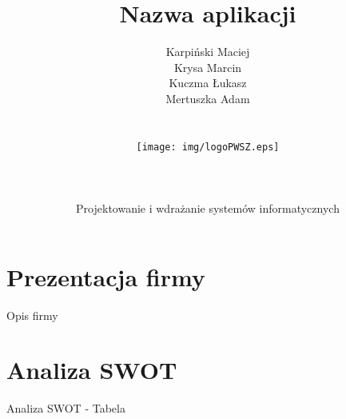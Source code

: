 \documentclass[12pt,a4paper]{article}
\author{Karpiński Maciej\\Krysa Marcin\\Kuczma Łukasz\\Mertuszka Adam\\\\\\\texttt{[image: img/logoPWSZ.eps]}\\\\\\\\Projektowanie i wdrażanie systemów informatycznych}
\title{Nazwa aplikacji}
\begin{document}
	\maketitle
	\thispagestyle{empty}
	\clearpage

	\tableofcontents
	\newpage

	\section{Prezentacja firmy}
		\indent Opis firmy
	\newpage

	\section{Analiza SWOT}
		\indent Analiza SWOT - Tabela
	\newpage
	
\end{document}
